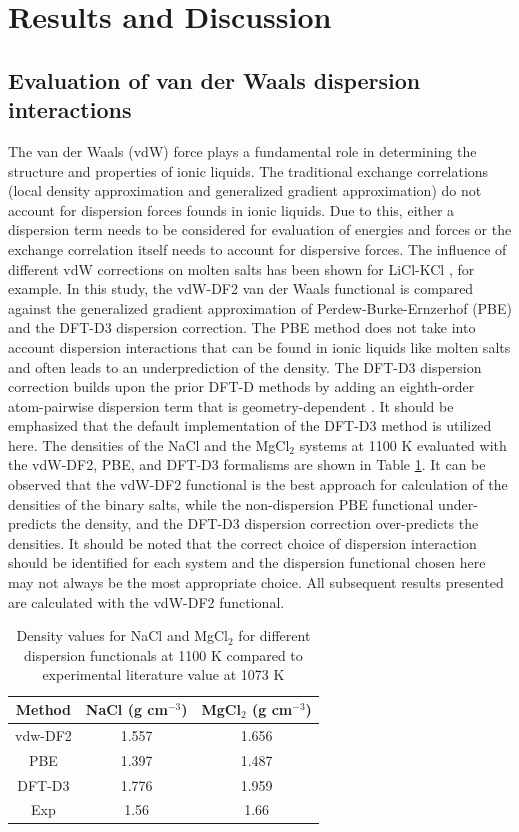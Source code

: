 \documentclass[review]{elsarticle}
\begin{document}
\section{Results and Discussion}

\subsection{Evaluation of van der Waals dispersion interactions}

The van der Waals (vdW) force plays a fundamental role in determining the structure and properties of ionic liquids. The traditional exchange correlations (local density approximation and generalized gradient approximation) do not account for dispersion forces founds in ionic liquids. Due to this, either a dispersion term needs to be considered for evaluation of energies and forces or the exchange correlation itself needs to account for dispersive forces. The influence of different vdW corrections on molten salts has been shown for LiCl-KCl \cite{Duemmler2021}, for example. In this study, the vdW-DF2 van der Waals functional \cite{Dion2004} is compared against the generalized gradient approximation of Perdew-Burke-Ernzerhof (PBE) \cite{PBE1996} and the DFT-D3 \cite{grimm2010} dispersion correction. The PBE method does not take into account dispersion interactions that can be found in ionic liquids like molten salts and often leads to an underprediction of the density. The DFT-D3 dispersion correction builds upon the prior DFT-D methods by adding an eighth-order atom-pairwise dispersion term that is geometry-dependent \cite{grimm2010}. It should be emphasized that the default implementation of the DFT-D3 method is utilized here. The densities of the NaCl and the MgCl$_2$ systems at 1100 K evaluated with the vdW-DF2, PBE, and DFT-D3 formalisms are shown in Table \ref{table:functional}. It can be observed that the vdW-DF2 functional is the best approach for calculation of the densities of the binary salts, while the non-dispersion PBE functional under-predicts the density, and the DFT-D3 dispersion correction over-predicts the densities. It should be noted that the correct choice of dispersion interaction should be identified for each system and the dispersion functional chosen here may not always be the most appropriate choice. All subsequent results presented are calculated with the vdW-DF2 functional.
\begin{table}[h]
\centering
\caption{Density values for NaCl and MgCl$_2$ for different dispersion functionals at 1100 K compared to experimental literature value at 1073 K \cite{grjotheim1971} }
\begin{tabular}{|c|c|c|}
\hline
Method & NaCl (g cm$^{-3}$) & MgCl$_2$ (g cm$^{-3}$) \\
\hline

vdw-DF2	& 1.557       & 1.656\\
PBE	  & 1.397	      & 1.487\\
DFT-D3	& 1.776	      & 1.959\\
Exp	  & 1.56	      & 1.66\\

\hline
\end{tabular}
\label{table:functional}
\end{table}
\end{document}
